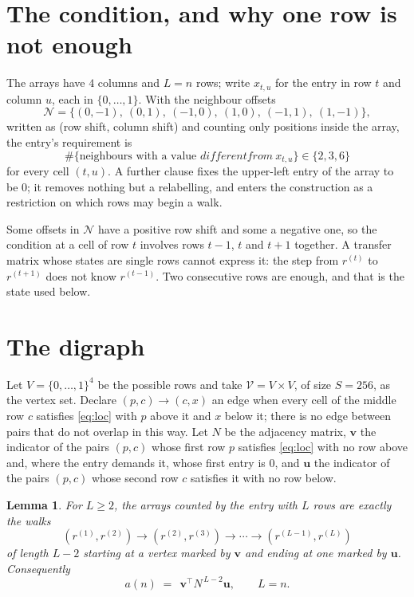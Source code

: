 \documentclass[11pt,a4paper]{article}
\theoremstyle{plain}
\newtheorem{lemma}[theorem]{Lemma}
\theoremstyle{definition}
\begin{document}
\section{The condition, and why one row is not enough}

The arrays have $4$ columns and $L=n$ rows; write $x_{t,u}$ for the entry in
row $t$ and column $u$, each in $\{0,\dots,1\}$. With the neighbour offsets
\[
\mathcal N=\{(0,-1),\ (0,1),\ (-1,0),\ (1,0),\ (-1,1),\ (1,-1)\},
\]
written as (row shift, column shift) and counting only positions inside the array, the
entry's requirement is
\begin{equation}\label{eq:loc}
\#\{\text{neighbours with a value }different from\ x_{t,u}\}\in\{2,3,6\}
\end{equation}
for every cell $(t,u)$. A further clause fixes the upper-left entry of the array to be $0$; it removes nothing but a relabelling, and enters the construction as a restriction on which rows may begin a walk.

Some offsets in $\mathcal N$ have a positive row shift and some a negative one, so the
condition at a cell of row $t$ involves rows $t-1$, $t$ and $t+1$ together. A transfer
matrix whose states are single rows cannot express it: the step from $r^{(t)}$ to
$r^{(t+1)}$ does not know $r^{(t-1)}$. Two consecutive rows are enough, and that is
the state used below.

\section{The digraph}

Let $V=\{0,\dots,1\}^{4}$ be the possible rows and take
$\mathcal V=V\times V$, of size $S=256$, as the vertex set. Declare $(p,c)\to(c,x)$ an edge
when every cell of the middle row $c$ satisfies \eqref{eq:loc} with $p$ above it and $x$
below it; there is no edge between pairs that do not overlap in this way. Let $N$ be the
adjacency matrix, $\mathbf{v}$ the indicator of the pairs $(p,c)$ whose first row $p$
satisfies \eqref{eq:loc} with no row above and, where the entry demands it, whose first entry is $0$, and $\mathbf{u}$ the indicator of
the pairs $(p,c)$ whose second row $c$ satisfies it with no row below.

\begin{lemma}\label{lem:walk}
For $L\ge2$, the arrays counted by the entry with $L$ rows are exactly the walks
\[
(r^{(1)},r^{(2)})\to(r^{(2)},r^{(3)})\to\cdots\to(r^{(L-1)},r^{(L)})
\]
of length $L-2$ starting at a vertex marked by $\mathbf{v}$ and ending at one marked by
$\mathbf{u}$. Consequently
\[
a(n)\;=\;\,\mathbf{v}^{\!\top}N^{\,L-2}\mathbf{u},\qquad L=n .
\]
\end{lemma}
\end{document}
